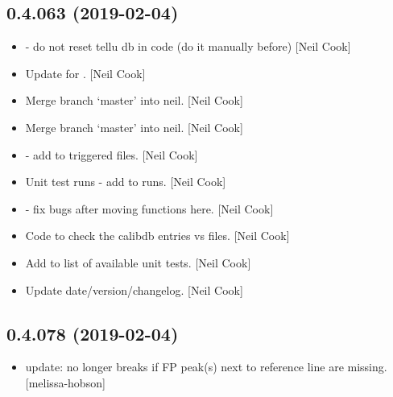 \documentclass[a4paper,10pt,english]{report}
\begin{document}
\subsection{0.4.063 (2019-02-04)}
\label{\detokenize{misc/changelog:id196}}\begin{itemize}
\item {} 
 - do not reset tellu db in code (do it manually
before) {[}Neil Cook{]}

\item {} 
Update  for . {[}Neil Cook{]}

\item {} 
Merge branch ‘master’ into neil. {[}Neil Cook{]}

\item {} 
Merge branch ‘master’ into neil. {[}Neil Cook{]}

\item {} 
 - add  to triggered files. {[}Neil
Cook{]}

\item {} 
Unit test runs - add  to runs. {[}Neil Cook{]}

\item {} 
 - fix bugs after moving functions here. {[}Neil Cook{]}

\item {} 
Code to check the calibdb entries vs files. {[}Neil Cook{]}

\item {} 
Add  to list of available unit tests. {[}Neil Cook{]}

\item {} 
Update date/version/changelog. {[}Neil Cook{]}

\end{itemize}


\subsection{0.4.078 (2019-02-04)}
\label{\detokenize{misc/changelog:id197}}\begin{itemize}
\item {} 
 update: no longer breaks if FP peak(s) next to reference
line are missing. {[}melissa-hobson{]}

\end{itemize}
\end{document}
